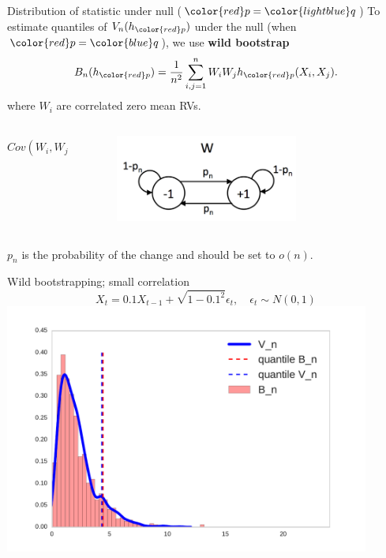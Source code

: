 \documentclass{beamer}
\begin{document}
 
  \begin{frame}{Distribution of statistic under null (${ \color{red} p} =  {\color{lightblue} q}$)}
To estimate quantiles of $ V_n(h_{\color{red} p})$ under the null  (when ${ \color{red} p} =  {\color{blue} q}$), we use {\bf wild bootstrap}
\[
 B_n(h_{\color{red} p}) = \frac {1} {n^2} \sum_{i,j=1}^n W_i W_j h_{\color{red} p}(X_i,X_j).
\]
  where $W_i$ are correlated zero mean RVs.
  
 \vspace{-0.3cm} 
\begin{columns}
        \begin{column}{.5\textwidth}
         $$
  Cov(W_i,W_j) = (1-2p_n)^{-|i-j|}
  $$
        \end{column}
        \begin{column}{.5\textwidth}
            \begin{figure}
            \vspace{-0.5cm}
           \includegraphics[width=0.7\textwidth, angle =0 ]{./img/W_graphicalModel.pdf} 
        \end{figure}
        \end{column}
    \end{columns}
    $p_n$ is  the probability of the change  and should be set to $o(n)$.
  \end{frame}


  
 \begin{frame}{Wild bootstrapping; small correlation }
\centering
 $$X_t = 0.1 X_{t-1} + \sqrt{1 - 0.1^2}\epsilon_t, \quad \epsilon_t \sim N(0,1)$$
 \includegraphics[width=0.9\textwidth]{./img/bootstrapWorks1.pdf}

 \end{frame}
\end{document}
